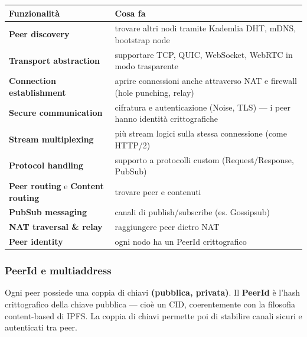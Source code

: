 \documentclass[
  italian,
  openany]{book}
\newcounter{none} %
\begin{document}
{\def\LTcaptype{none} %
\begin{longtable}[]{@{}
  >{\raggedright\arraybackslash}p{}
  >{\raggedright\arraybackslash}p{}@{}}
\toprule\noalign{}
\begin{minipage}[b]{\linewidth}\raggedright
Funzionalità
\end{minipage} & \begin{minipage}[b]{\linewidth}\raggedright
Cosa fa
\end{minipage} \\
\midrule\noalign{}
\endhead
\bottomrule\noalign{}
\endlastfoot
\textbf{Peer discovery} & trovare altri nodi tramite Kademlia DHT, mDNS,
bootstrap node \\
\textbf{Transport abstraction} & supportare TCP, QUIC, WebSocket, WebRTC
in modo trasparente \\
\textbf{Connection establishment} & aprire connessioni anche attraverso
NAT e firewall (hole punching, relay) \\
\textbf{Secure communication} & cifratura e autenticazione (Noise, TLS)
--- i peer hanno identità crittografiche \\
\textbf{Stream multiplexing} & più stream logici sulla stessa
connessione (come HTTP/2) \\
\textbf{Protocol handling} & supporto a protocolli custom
(Request/Response, PubSub) \\
\textbf{Peer routing} e \textbf{Content routing} & trovare peer e
contenuti \\
\textbf{PubSub messaging} & canali di publish/subscribe (es.
Gossipsub) \\
\textbf{NAT traversal \& relay} & raggiungere peer dietro NAT \\
\textbf{Peer identity} & ogni nodo ha un PeerId crittografico \\
\end{longtable}
}

\subsubsection{PeerId e multiaddress}\label{peerid-e-multiaddress}

Ogni peer possiede una coppia di chiavi \textbf{(pubblica, privata)}. Il
\textbf{PeerId} è l'hash crittografico della chiave pubblica --- cioè un
CID, coerentemente con la filosofia content-based di IPFS. La coppia di
chiavi permette poi di stabilire canali sicuri e autenticati tra peer.
\end{document}
